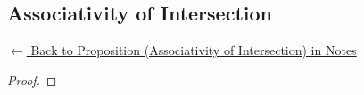 
\subsection*{Associativity of Intersection}
\label{prf:assoc-intersection}

\begin{remark*}[Return]
\hyperref[prop:assoc-intersection]{$\leftarrow$ Back to Proposition (Associativity of Intersection) in Notes}
\end{remark*}

\begin{proof}
\end{proof}

\begin{remark*}

\end{remark*}

\begin{remark*}[Dependencies]

\FlashUses{}
\end{remark*}

